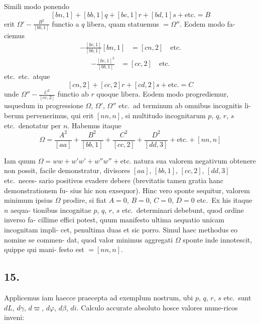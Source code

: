 \documentclass[12pt,a4paper]{article}
\begin{document}
Simili modo ponendo
\[
[bn, 1] + [bb, 1]q + [bc, 1]r + [bd, 1]s + \text{etc.} = B
\]
erit $\Omega' - \frac{B^2}{[bb, 1]}$ functio a $q$ libera, quam statuemus $= \Omega''$. Eodem modo fa-
ciemus
\begin{align*}
[cn, 1] - \frac{[bc, 1]}{[bb, 1]}[bn, 1] &= [cn, 2] \quad \text{etc.}
\end{align*}
\begin{align*}
[cc, 1] - \frac{[bc, 1]^2}{[bb, 1]} &= [cc, 2] \quad \text{etc.}
\end{align*}
etc.\ etc.\ atque
\[
[cn, 2] + [cc, 2]r + [cd, 2]s + \text{etc.} = C
\]
unde $\Omega'' - \frac{C^2}{[cc, 2]}$ functio ab $r$ quoque libera. Eodem modo progrediemur,
usquedum in progressione $\Omega$, $\Omega'$, $\Omega''$ etc.\ ad terminum ab omnibus incognitis li-
berum pervenerimus, qui erit $[nn, n]$, si multitudo incognitarum $p$, $q$, $r$, $s$ etc.\ denotatur per $n$. Habemus itaque
\[
\Omega = \frac{A^2}{[aa]} + \frac{B^2}{[bb, 1]} + \frac{C^2}{[cc, 2]} + \frac{D^2}{[dd, 3]} + \text{etc.} + [nn, n]
\]

Iam quum $\Omega = ww + w'w' + w''w'' + \text{etc.}$ natura sua valorem negativum obtenere
non possit, facile demonstratur, divisores $[aa]$, $[bb, 1]$, $[cc, 2]$, $[dd, 3]$ etc.\ neces-
sario positivos evadere debere (brevitatis tamen gratia hanc demonstrationem fu-
sius hic non exsequor). Hinc vero sponte sequitur, valorem minimum ipsius $\Omega$
prodire, si fiat $A = 0$, $B = 0$, $C = 0$, $D = 0$ etc.\ Ex his itaque $n$ aequa-
tionibus incognitae $p$, $q$, $r$, $s$ etc.\ determinari debebunt, quod ordine inverso fa-
cillime effici potest, quum manifesto ultima aequatio unicam incognitam impli-
cet, penultima duas et sic porro. Simul haec methodus eo nomine se commen-
dat, quod valor minimus aggregati $\Omega$ sponte inde innotescit, quippe qui mani-
festo est $= [nn, n]$.

\subsection*{15.}

Applicemus iam haecce praecepta ad exemplum nostrum, ubi $p$, $q$, $r$, $s$ etc.\ sunt $dL$, $d\gamma$, $d\varpi$, $d\varphi$, $d\beta$, $di$. Calculo accurate absoluto hosce valores nume-ricos inveni:
\end{document}
